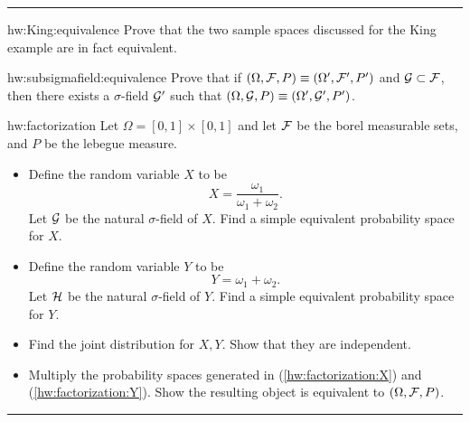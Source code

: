 \documentclass[14pt]{extarticle}
\newenvironment{textHW}{
  \noindent\rule{\textwidth}{1pt}%
  \begin{list}{}{
      \setlength{\labelwidth}{1cm}
      \setlength{\labelsep}{0.3cm}
      \setlength{\leftmargin}{1.3cm}
      \setlength{\rightmargin}{1cm}
      \setlength{\parsep}{0.5ex plus0.2ex minus0.1ex}
      \setlength{\topsep}{1pt plus3pt minus1pt}
      \setlength{\itemsep}{0ex plus0.2ex} 
      \renewcommand{\makelabel}[1]{\label{thw:##1}{\ref{##1}}}
      \sl}}%
  {\end{list}\rule{\textwidth}{1pt}}
\begin{document}
\begin{textHW}
\item[hw:King:equivalence] Prove that the two sample spaces discussed for
  the King example are in fact equivalent.
\item[hw:subsigmafield:equivalence] Prove that if $(\Omega,{\cal F},P)
  \equiv (\Omega',{\cal F}',P')$ and ${\cal G} \subset {\cal F}$,
  then there exists a $\sigma$-field ${\cal G}'$ such that
  $(\Omega,{\cal G},P) \equiv (\Omega',{\cal G}',P')$.
\item[hw:factorization] Let $\Omega = [0,1] \times [0,1]$ and let
  ${\cal F}$ be the borel measurable sets, and $P$ be the lebegue
  measure.
  \begin{itemize}
  \item \label{hw:factorization:X} Define the random variable $X$ to
    be
    $$X = \frac{\omega_1}{\omega_1 + \omega_2}.$$ 
    Let ${\cal G}$ be the natural $\sigma$-field of $X$.  Find a
    simple equivalent probability space for $X$.
  \item \label{hw:factorization:Y} Define the random variable $Y$ to
    be
    $$Y = \omega_1 + \omega_2.$$ 
    Let ${\cal H}$ be the natural $\sigma$-field of $Y$.  Find a
    simple equivalent probability space for $Y$.
  \item Find the joint distribution for $X,Y$.  Show that they are
    independent. 
  \item Multiply the probability spaces generated in
    (\ref{hw:factorization:X}) and (\ref{hw:factorization:Y}).  Show
    the resulting object is equivalent to $(\Omega,{\cal F},P)$.
  \end{itemize}
\end{textHW}
 
\end{document}
